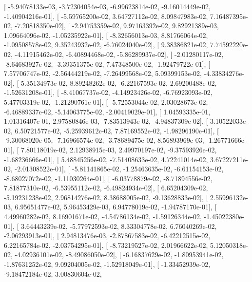 \documentclass{article}
\begin{document}
       [ -5.94078133e-03,  -3.72304054e-03,  -6.99623814e-02,
         -9.16014449e-02,  -1.40904216e-01],
       [ -5.59765200e-02,   3.64727112e-02,   8.09847983e-02,
          7.16487395e-02,  -7.20818350e-02],
       [ -2.94753359e-02,   9.97163392e-02,   9.82921389e-03,
          1.09664096e-02,  -1.05235922e-01],
       [ -8.32656013e-03,   8.81766064e-02,  -1.09508578e-02,
          9.35243932e-02,  -6.76024040e-02],
       [  9.38386821e-02,   7.74592220e-02,  -4.11915462e-02,
         -6.40894468e-02,  -5.86289937e-02],
       [ -2.01280117e-02,  -8.64683927e-02,  -3.39351375e-02,
          7.47348500e-02,  -1.92479722e-01],
       [  7.57706747e-02,  -2.56444219e-02,  -7.26499568e-02,
          5.09399153e-02,  -4.33834276e-02],
       [  5.35134973e-02,   8.89248262e-02,  -6.22167593e-02,
          2.69200488e-02,  -1.52631208e-01],
       [ -8.41067737e-02,  -4.14923426e-02,  -6.76923093e-02,
          5.47703319e-02,  -1.21290761e-01],
       [ -5.72553044e-02,   2.03028673e-02,  -6.46889337e-02,
         -5.14063775e-02,  -2.00419029e-01],
       [  1.04593335e-01,   1.01316407e-01,   2.97580846e-03,
         -7.83513943e-02,  -4.94837309e-02],
       [  3.10522033e-02,   6.50721577e-02,  -5.25939612e-02,
          7.87169552e-02,  -1.98296190e-01],
       [ -9.30068020e-05,  -7.16966574e-02,  -3.78689475e-02,
          8.56893969e-03,  -1.26771666e-01],
       [  7.80118019e-02,   2.12938915e-03,   2.49970197e-02,
         -9.37593926e-02,  -1.68236666e-01],
       [  5.48845256e-02,  -7.51408633e-02,   4.72241014e-02,
          3.67227211e-02,  -2.01308522e-01],
       [ -5.81141865e-02,  -1.25463635e-02,  -6.61154153e-02,
         -8.68027072e-02,  -1.11030264e-01],
       [ -6.03778879e-02,  -8.71894556e-02,   7.81877310e-02,
         -6.53955112e-02,  -6.49824934e-02],
       [  6.65204309e-02,  -5.19231238e-02,   2.96814276e-02,
          8.38688005e-02,  -9.13628833e-02],
       [  2.55996132e-03,   6.95651477e-02,   5.96453429e-03,
          6.94778019e-02,  -1.94787170e-01],
       [  4.49960282e-02,   8.16901671e-02,  -4.54786134e-02,
         -1.59126344e-02,  -1.45022380e-01],
       [  3.64443239e-02,  -5.77972593e-02,   8.33304778e-02,
          6.76040269e-02,  -2.06293913e-01],
       [  2.94813476e-03,  -2.87867583e-02,  -6.42212515e-02,
          6.22165784e-02,  -2.03754295e-01],
       [ -8.73219527e-02,   2.01966622e-02,   5.12050318e-02,
         -4.02936101e-02,  -8.49086050e-02],
       [ -6.16837629e-02,  -1.80953941e-02,  -1.87631252e-02,
          9.09204005e-02,  -1.52918049e-01],
       [ -1.33452939e-02,  -9.18472184e-02,   3.00830604e-02,
\end{document}
